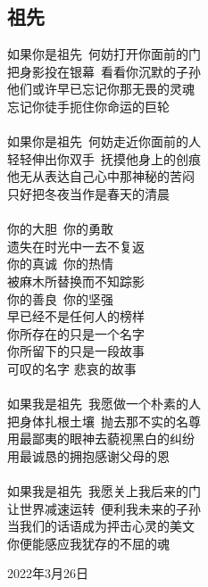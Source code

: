 \documentclass[a5paper]{ctexart}
\begin{document}
	\subsection{祖先}
	\begin{center}
		如果你是祖先\ 何妨打开你面前的门\\
		把身影投在银幕\ 看看你沉默的子孙\\
		他们或许早已忘记你那无畏的灵魂\\
		忘记你徒手扼住你命运的巨轮\\ \hspace*{\fill} \\
		
		如果你是祖先\ 何妨走近你面前的人\\
		轻轻伸出你双手\ 抚摸他身上的创痕\\
		他无从表达自己心中那神秘的苦闷\\
		只好把冬夜当作是春天的清晨\\ \hspace*{\fill} \\
		
		你的大胆\ 你的勇敢\\
		遗失在时光中一去不复返\\
		你的真诚\ 你的热情\\
		被麻木所替换而不知踪影\\
		你的善良\ 你的坚强\\
		早已经不是任何人的榜样\\
		你所存在的只是一个名字\\
		你所留下的只是一段故事\\
		可叹的名字 悲哀的故事\\ \hspace*{\fill} \\
		
		如果我是祖先\ 我愿做一个朴素的人\\
		把身体扎根土壤\ 抛去那不实的名尊\\
		用最鄙夷的眼神去藐视黑白的纠纷\\
		用最诚恳的拥抱感谢父母的恩\\ \hspace*{\fill} \\
		
		如果我是祖先\ 我愿关上我后来的门\\
		让世界减速运转\ 便利我未来的子孙\\
		当我们的话语成为抨击心灵的美文\\
		你便能感应我犹存的不屈的魂
	\end{center}
	\hfill 2022年3月26日
	
\end{document}
